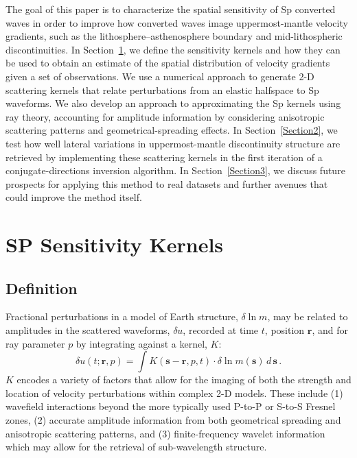 \documentclass[referee]{gji}
\begin{document}
The goal of this paper is to characterize the spatial sensitivity of Sp converted waves in order to improve how converted waves image uppermost-mantle velocity gradients, such as the lithosphere--asthenosphere boundary and mid-lithospheric discontinuities.  In Section~\ref{Section1}, we define the sensitivity kernels and how they can be used to obtain an estimate of the spatial distribution of velocity gradients given a set of observations.  We use a numerical approach to generate 2-D scattering kernels that relate perturbations from an elastic halfspace to Sp waveforms. We also develop an approach to approximating the Sp kernels using ray theory, accounting for amplitude information by considering anisotropic scattering patterns and geometrical-spreading effects.
In Section~\ref{Section2}, we test how well lateral variations in uppermost-mantle discontinuity structure are retrieved by implementing these scattering kernels in the first iteration of a conjugate-directions inversion algorithm.  
In Section~\ref{Section3}, we discuss future prospects for applying this method to real datasets and further avenues that could improve the method itself.

\section{SP Sensitivity Kernels}
\label{Section1}

\subsection{Definition}

Fractional perturbations in a model of Earth structure, $\delta \ln{m}$, may be related to amplitudes in the scattered waveforms, $\delta u$, recorded at time $t$, position $\textbf{r}$, and for ray parameter $p$ by integrating against a kernel, $K$:
\begin{equation}
\delta u(t;\textbf{r},p) = \int K(\textbf{s}-\textbf{r},p,t) \cdot \delta \ln{m(\textbf{s})} \, d \, \textbf{s} \,.
\label{eqn:kernel_def}
\end{equation}
$K$ encodes a variety of factors that allow for the imaging of both the strength and location of velocity perturbations within complex 2-D models.  These include (1) wavefield interactions beyond the more typically used P-to-P or S-to-S Fresnel zones, (2) accurate amplitude information from both geometrical spreading and anisotropic scattering patterns, and (3) finite-frequency wavelet information which may allow for the retrieval of sub-wavelength structure.
\end{document}
